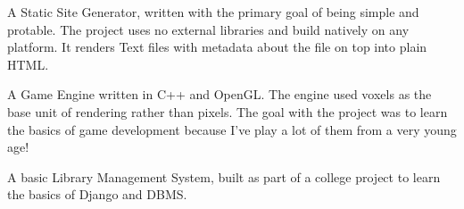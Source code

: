 \documentclass[]{resume-openfont}
\begin{document}
\begin{minipage}[t]{0.66\textwidth}
A Static Site Generator, written with the primary goal of being simple and protable. The project uses no external libraries and build natively on any platform. It renders Text files with metadata about the file on top into plain HTML.\\
\sectionsep

A Game Engine written in C++ and OpenGL. The engine used voxels as the base unit of rendering rather than pixels. The goal with the project was to learn the basics of game development because I've play a lot of them from a very young age!\\
\sectionsep

A basic Library Management System, built as part of a college project to learn the basics of Django and DBMS.\\
\sectionsep


\end{minipage}
\end{document}
